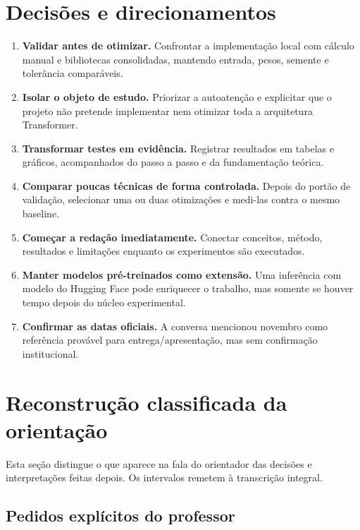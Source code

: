 \section{Decisões e direcionamentos}


\begin{enumerate}
\item \textbf{Validar antes de otimizar.} Confrontar a implementação local com cálculo
manual e bibliotecas consolidadas, mantendo entrada, pesos, semente e
tolerância comparáveis.
\item \textbf{Isolar o objeto de estudo.} Priorizar a autoatenção e explicitar que o
projeto não pretende implementar nem otimizar toda a arquitetura Transformer.
\item \textbf{Transformar testes em evidência.} Registrar resultados em tabelas e
gráficos, acompanhados do passo a passo e da fundamentação teórica.
\item \textbf{Comparar poucas técnicas de forma controlada.} Depois do portão de
validação, selecionar uma ou duas otimizações e medi-las contra o mesmo
baseline.
\item \textbf{Começar a redação imediatamente.} Conectar conceitos, método, resultados e
limitações enquanto os experimentos são executados.
\item \textbf{Manter modelos pré-treinados como extensão.} Uma inferência com modelo do
Hugging Face pode enriquecer o trabalho, mas somente se houver tempo depois do
núcleo experimental.
\item \textbf{Confirmar as datas oficiais.} A conversa mencionou novembro como referência
provável para entrega/apresentação, mas sem confirmação institucional.
\end{enumerate}


\section{Reconstrução classificada da orientação}




Esta seção distingue o que aparece na fala do orientador das decisões e interpretações feitas depois. Os intervalos remetem à transcrição integral.



\subsection{Pedidos explícitos do professor}


